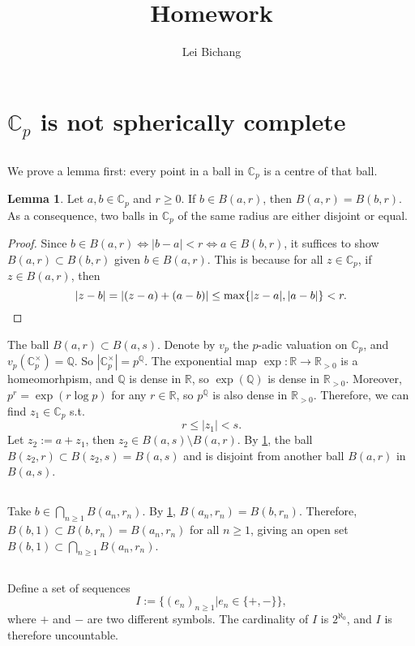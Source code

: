 \documentclass{article}
\title{Homework}
\author{Lei Bichang}
\date{}
\theoremstyle{definition}
\newtheorem{lemma}{Lemma}
\theoremstyle{remark}
\newcommand{\R}{\mathbb{R}}
\newcommand{\C}{\mathbb{C}}
\newcommand{\Q}{\mathbb{Q}}
\begin{document}
\maketitle

\section{\texorpdfstring{$\C_p$}{Cp} is not spherically complete}
\subsection{}
We prove a lemma first: every point in a ball in $\C_p$ is a centre of that ball.
\begin{lemma}\label{centre of ball}
    Let $a, b\in \C_p$ and $r \ge 0$. If $b\in B(a, r)$, then $B(a, r) = B(b, r)$.
    As a consequence, two balls in $\C_p$ of the same radius are either disjoint or equal.
\end{lemma}
\begin{proof}
    Since $b\in B(a, r)\iff |b - a| < r\iff a\in B(b, r)$, it suffices to show $B(a, r)\subset B(b, r)$ given $b\in B(a, r)$.
    This is because for all $z\in \C_p$, if $z\in B(a, r)$, then \[|z - b| = |(z - a) + (a - b)|\le \max\{|z-a|, |a-b|\} < r.\qedhere\]
\end{proof}
The ball $B(a, r)\subset B(a, s)$. 
Denote by $v_p$ the $p$-adic valuation on $\C_p$,
and $v_p(\C_p^\times) = \Q$.
So $|\C_p^\times| = p^{\Q}$.
The exponential map $\exp : \R\to\R_{>0}$ is a homeomorhpism, and $\Q$ is dense in $\R$,
so $\exp(\Q)$ is dense in $\R_{>0}$.
Moreover, $p^r = \exp(r\log p)$ for any $r\in \R$,
so $p^{\Q}$ is also dense in $\R_{>0}$.
Therefore, we can find $z_1\in \C_p$ s.t. \[r\le |z_1| < s.\]
Let $z_2 := a + z_1$, then $z_2\in B(a, s)\setminus B(a, r)$. By \cref{centre of ball},
the ball $B(z_2, r)\subset B(z_2, s) = B(a, s)$ and is disjoint from another ball $B(a,r)$ in $B(a,s)$.

\subsection{}
Take $b\in \bigcap_{n\ge 1}B(a_n, r_n)$.
By \cref{centre of ball}, $B(a_n, r_n) = B(b, r_n)$.
Therefore, $B(b, 1)\subset B(b, r_n) = B(a_n, r_n)$ for all $n\ge 1$, giving an open set $B(b, 1)\subset\bigcap_{n\ge 1}B(a_n, r_n)$.

\subsection{}
Define a set of sequences \[I := \{(e_n)_{n\ge 1} | e_n\in\{+, -\}\},\]
where $+$ and $-$ are two different symbols.
The cardinality of $I$ is $2^{\aleph_0}$, and $I$ is therefore uncountable.
\end{document}
